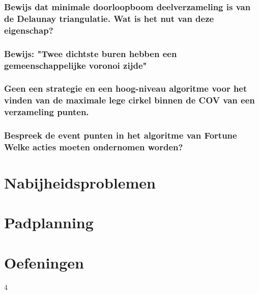 \documentclass[12pt,a4paper]{article}
\begin{document}
\section{Bewijs dat minimale doorloopboom deelverzameling is van de Delaunay triangulatie. Wat is het nut van deze eigenschap?}
\section{Bewijs: "Twee dichtste buren hebben een gemeenschappelijke voronoi zijde"}
\section{Geen een strategie en een hoog-niveau algoritme  voor het vinden van de maximale lege cirkel binnen de COV van een verzameling punten.}
\section{Bespreek de event punten in het algoritme van Fortune Welke acties moeten ondernomen worden?}
\fi

\part{Nabijheidsproblemen}



\part{Padplanning}


\part{Oefeningen}




4





\end{document}
